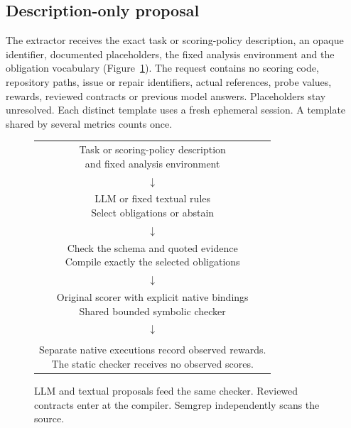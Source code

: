 \documentclass[sigconf]{acmart}
\newcommand{\Unknown}{\textsc{Unknown}}
\newcommand{\Alarm}{\textsc{Alarm}}
\newcommand{\NoAlarm}{\textsc{NoAlarm}}
\begin{document}
\subsection{Description-only proposal}

The extractor receives the exact task or scoring-policy description, an opaque identifier, documented placeholders, the fixed analysis environment and the obligation vocabulary (Figure~\ref{fig:pipeline}). The request contains no scoring code, repository paths, issue or repair identifiers, actual references, probe values, rewards, reviewed contracts or previous model answers. Placeholders stay unresolved. Each distinct template uses a fresh ephemeral session. A template shared by several metrics counts once.

\begin{figure}[t]
\centering\small
\begin{tabular}{c}
\fbox{\parbox{0.90\columnwidth}{\centering Task or scoring-policy description\\and fixed analysis environment}}\\[3pt]
$\downarrow$\\[-1pt]
\fbox{\parbox{0.90\columnwidth}{\centering LLM or fixed textual rules\\Select obligations or abstain}}\\[3pt]
$\downarrow$\\[-1pt]
\fbox{\parbox{0.90\columnwidth}{\centering Check the schema and quoted evidence\\Compile exactly the selected obligations}}\\[3pt]
$\downarrow$\\[-1pt]
\fbox{\parbox{0.90\columnwidth}{\centering Original scorer with explicit native bindings\\Shared bounded symbolic checker}}\\[3pt]
$\downarrow$\\[-1pt]
\fbox{\parbox{0.90\columnwidth}{\centering Per-obligation \Alarm{}, \NoAlarm{} or \Unknown{}}}\\[14pt]
\parbox{0.90\columnwidth}{\centering Separate native executions record observed rewards.\\The static checker receives no observed scores.}
\end{tabular}
\caption{LLM and textual proposals feed the same checker. Reviewed contracts enter at the compiler. Semgrep independently scans the source.}
\label{fig:pipeline}
\end{figure}
\end{document}
